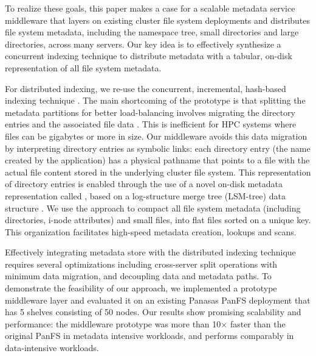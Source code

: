 To realize these goals, this paper makes a case for a scalable metadata service
middleware that layers on existing cluster file system deployments and
distributes file system metadata, including the namespace tree, small
directories and large directories, across many servers.
Our key idea is to effectively synthesize a concurrent indexing
technique to distribute metadata with a tabular, on-disk representation of all
file system metadata.

For distributed indexing, we re-use the concurrent, incremental, hash-based
\giga indexing technique \cite{GIGA11}.
The main shortcoming of the \giga prototype is that splitting
the metadata partitions for better load-balancing involves migrating the
directory entries and the associated file data \cite{GIGA11}.
This is inefficient for HPC systems where files can be gigabytes or more in
size. Our middleware avoids this data migration by interpreting directory
entries as symbolic links: each directory entry (the name created by the
application) has a physical pathname that points to a file
with the actual file content stored in the underlying cluster file system.
This representation of directory entries is enabled through the use
of a novel on-disk metadata representation called \tfs \cite{TableFS},
based on a log-structure merge tree (LSM-tree) data structure \cite{ONeil1996}.
We use the \tfs approach to compact all file system metadata
(including directories, i-node attributes) and small files,
into flat files sorted on a unique key.
This organization facilitates high-speed metadata creation, lookups and scans.

Effectively integrating \tfs metadata store with the distributed indexing
technique requires several optimizations including cross-server split operations
with minimum data migration, and decoupling data and metadata paths.
To demonstrate the feasibility of our approach,
we implemented a prototype middleware layer and evaluated it
on an existing Panasas PanFS deployment \cite{PanFS} that has 5 shelves consisting of 50 nodes.
Our results show promising scalability and performance:
the middleware prototype was more than 10$\times$ faster than the original PanFS
in metadata intensive workloads, and performs comparably in data-intensive workloads.
